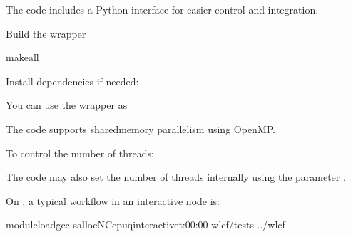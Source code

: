 \documentclass[letterpaper,10pt,english]{sphinxmanual}
\begin{document}
\sphinxAtStartPar
The code includes a Python interface for easier control and integration.

\sphinxAtStartPar
Build the wrapper

\begin{sphinxVerbatim}[commandchars=\\\{\}]
makeall
\end{sphinxVerbatim}

\sphinxAtStartPar
Install dependencies if needed:

\sphinxAtStartPar
You can use the wrapper as

\begin{sphinxVerbatim}[commandchars=\\\{\}]
 

  
 
\end{sphinxVerbatim}

\sphinxAtStartPar
{}

\sphinxAtStartPar
The code supports shared\sphinxhyphen{}memory parallelism using OpenMP.

\sphinxAtStartPar
To control the number of threads:

\begin{sphinxVerbatim}[commandchars=\\\{\}]
\end{sphinxVerbatim}

\sphinxAtStartPar
The code may also set the number of threads internally using the parameter .

\sphinxAtStartPar
{}

\sphinxAtStartPar
On , a typical workflow in an interactive node is:

\begin{sphinxVerbatim}[commandchars=\\\{\}]
moduleloadgcc
salloc\PYGZhy{}N\PYGZhy{}Ccpu\PYGZhy{}qinteractive\PYGZhy{}t:00:00
wlcf/tests
../wlcf
\end{sphinxVerbatim}
\end{document}
